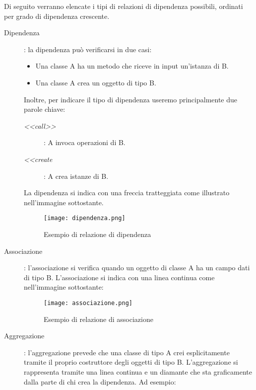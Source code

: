 \documentclass[../../norme-di-progetto.tex]{subfiles}
\begin{document}
\begin{description}
        Di seguito verranno elencate i tipi di relazioni di dipendenza possibili, ordinati per grado di dipendenza crescente.
        \begin{description}
          \item [Dipendenza]: la dipendenza può verificarsi in due casi:
                \begin{itemize}
                  \item Una classe A ha un metodo che riceve in input un'istanza di B.
                  \item Una classe A crea un oggetto di tipo B.
                \end{itemize}
                Inoltre, per indicare il tipo di dipendenza useremo principalmente due parole chiave:
                \begin{description}
                  \item [\textit{<<call>>}]: A invoca operazioni di B.
                  \item [\textit{<<create}]: A crea istanze di B.
                \end{description}
                La dipendenza si indica con una freccia tratteggiata come illustrato nell'immagine sottostante.
                \begin{figure}[H]%
                  \label{fig:dipendenza}
                  \texttt{[image: dipendenza.png]}
                  \centering
                  \caption{Esempio di relazione di dipendenza}
                \end{figure}
          \item [Associazione]: l'associazione si verifica quando un oggetto di classe A ha un campo dati di tipo B.
                L'associazione si indica con una linea continua come nell'immagine sottostante:
                \begin{figure}[H]%
                  \label{fig:associazione}
                  \texttt{[image: associazione.png]}
                  \centering
                  \caption{Esempio di relazione di associazione}
                \end{figure}
          \item [Aggregazione]: l'aggregazione prevede che una classe di tipo A crei esplicitamente tramite il proprio costruttore degli oggetti di tipo B.
                L'aggregazione si rappresenta tramite una linea continua e un diamante che sta graficamente dalla parte di chi crea la dipendenza. Ad esempio:
                \begin{figure}[H]%

\end{figure}
\end{description}
\end{description}
\end{document}
